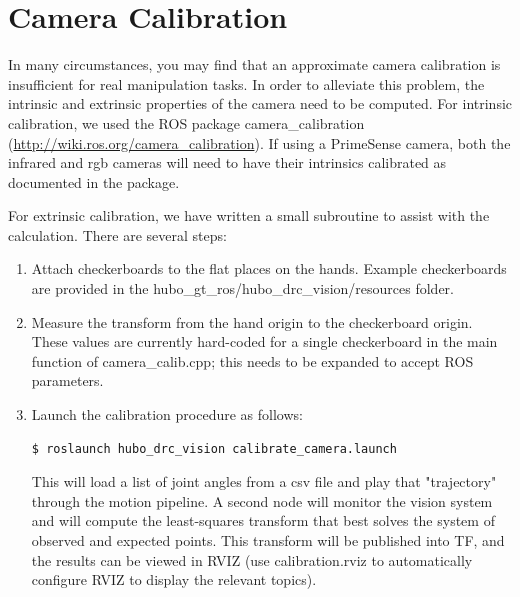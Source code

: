 \documentclass[letterpaper, 10 pt]{report}
\begin{document}
\pagebreak
\section{Camera Calibration} \label{sec:calibration}
In many circumstances, you may find that an approximate camera calibration is insufficient for real manipulation tasks.
In order to alleviate this problem, the intrinsic and extrinsic properties of the camera need to be computed.
For intrinsic calibration, we used the ROS package camera\_calibration (\url{http://wiki.ros.org/camera_calibration}). If using a PrimeSense camera, both the infrared and rgb cameras will need to have their intrinsics calibrated as documented in the package.

For extrinsic calibration, we have written a small subroutine to assist with the calculation.
There are several steps:
\begin{enumerate}
  \item Attach checkerboards to the flat places on the hands. Example checkerboards are provided in the hubo\_gt\_ros/hubo\_drc\_vision/resources folder.
  \item Measure the transform from the hand origin to the checkerboard origin. These values are currently hard-coded for a single checkerboard in the main function of camera\_calib.cpp; this needs to be expanded to accept ROS parameters.
  \item Launch the calibration procedure as follows:
  \begin{lstlisting}[language=bash]
    $ roslaunch hubo_drc_vision calibrate_camera.launch
  \end{lstlisting}
  This will load a list of joint angles from a csv file and play that "trajectory" through the motion pipeline. A second node will monitor the vision system and will compute the least-squares transform that best solves the system of observed and expected points. This transform will be published into TF, and the results can be viewed in RVIZ (use calibration.rviz to automatically configure RVIZ to display the relevant topics).
\end{enumerate}

\pagebreak
\end{document}
